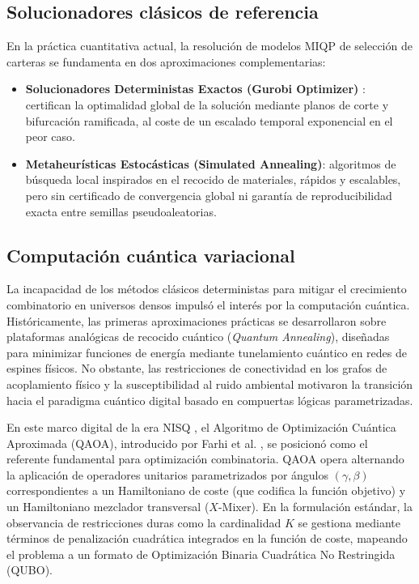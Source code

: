 \subsection{Solucionadores clásicos de referencia}
\label{subsec:solucionadores_clasicos}

En la práctica cuantitativa actual, la resolución de modelos MIQP de selección de carteras se fundamenta en dos aproximaciones complementarias:

\begin{itemize}
    \item \textbf{Solucionadores Deterministas Exactos (Gurobi Optimizer)}
    \cite{Gurobi2025}: certifican la optimalidad global de la solución
    mediante planos de corte y bifurcación ramificada, al coste de un
    escalado temporal exponencial en el peor caso.

    \item \textbf{Metaheurísticas Estocásticas (Simulated Annealing)}: algoritmos
    de búsqueda local inspirados en el recocido de materiales, rápidos y
    escalables, pero sin certificado de convergencia global ni garantía de
    reproducibilidad exacta entre semillas pseudoaleatorias.
\end{itemize}

\subsection{Computación cuántica variacional}
\label{subsec:qaoa_evolucion}

La incapacidad de los métodos clásicos deterministas para mitigar el crecimiento combinatorio en universos densos impulsó el interés por la computación cuántica. Históricamente, las primeras aproximaciones prácticas se desarrollaron sobre plataformas analógicas de recocido cuántico (\textit{Quantum Annealing}), diseñadas para minimizar funciones de energía mediante tunelamiento cuántico en redes de espines físicos. No obstante, las restricciones de conectividad en los grafos de acoplamiento físico y la susceptibilidad al ruido ambiental motivaron la transición hacia el paradigma cuántico digital basado en compuertas lógicas parametrizadas.

En este marco digital de la era NISQ \cite{Preskill2018}, el Algoritmo de Optimización Cuántica Aproximada (QAOA), introducido por Farhi et al. \cite{Farhi2014}, se posicionó como el referente fundamental para optimización combinatoria. QAOA opera alternando la aplicación de operadores unitarios parametrizados por ángulos $(\gamma, \beta)$ correspondientes a un Hamiltoniano de coste (que codifica la función objetivo) y un Hamiltoniano mezclador transversal ($X$-Mixer). En la formulación estándar, la observancia de restricciones duras como la cardinalidad $K$ se gestiona mediante términos de penalización cuadrática integrados en la función de coste, mapeando el problema a un formato de Optimización Binaria Cuadrática No Restringida (QUBO).

